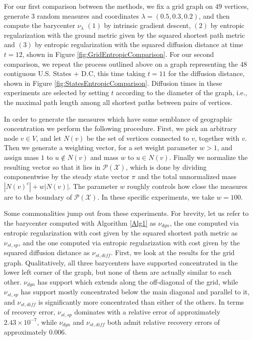 \documentclass{article}
\newcommand{\X}{\mathcal{X}}
\begin{document}
For our first comparison between the methods, we fix a grid graph on \(49\) vertices, generate \(3\) random measures and coordinates \(\lambda = (0.5, 0.3, 0.2)\), and then compute the barycenter \(\nu_\lambda\) \((1)\) by intrinsic gradient descent, \((2)\) by entropic regularization with the ground metric given by the squared shortest path metric and \((3)\) by entropic regularization with the squared diffusion distance at time \(t=12\), shown in Figure \ref{fig:GridEntropicComparison}. For our second comparison, we repeat the process outlined above on a graph representing the 48 contiguous U.S. States + D.C, this time taking \(t=11\) for the diffusion distance, shown in Figure \ref{fig:StatesEntropicComparison}. Diffusion times in these experiments are selected by setting \(t\) according to the diameter of the graph, i.e., the maximal path length among all shortest paths between pairs of vertices.

In order to generate the measures which have some semblance of geographic concentration we perform the following procedure. First, we pick an arbitrary node \(v \in V\), and let \(N(v)\) be the set of vertices connected to \(v\), together with \(v\). Then we generate a weighting vector, for a set weight parameter \(w > 1\), and assign mass \(1\) to \(u \notin N(v)\) and mass \(w\) to \(u \in N(v)\). Finally we normalize the resulting vector so that it lies in \(\mathcal{P}(\X)\), which is done by dividing componentwise by the steady state vector \(\pi\) and the total unnormalized mass \(|N(v)^c| + w|N(v)|\). The parameter \(w\) roughly controls how close the measures are to the boundary of \(\mathcal{P}(\X)\). In these specific experiments, we take \(w=100\).

Some commonalities jump out from these experiments. For brevity, let us refer to the barycenter computed with Algorithm \ref{Alg1} as \(\nu_{dyn}\), the one computed via entropic regularization with cost given by the squared shortest path metric as \(\nu_{st,sp}\), and the one computed via entropic regularization with cost given by the squared diffusion distance as \(\nu_{st, diff}\). 
First, we look at the results for the grid graph. Qualitatively, all three barycenters have supported concentrated in the lower left corner of the graph, but none of them are actually similar to each other. \(\nu_{dyn}\) has support which extends along the off-diagonal of the grid, while \(\nu_{st,sp}\) has support mostly concentrated below the main diagonal and parallel to it, and \(\nu_{st,diff}\) is significantly more concentrated than either of the others. In terms of recovery error, \(\nu_{st,sp}\) dominates with a relative error of approximately \(2.43\times 10^{-7}\), while \(\nu_{dyn}\) and \(\nu_{st,diff}\) both admit relative recovery errors of approximately \(0.006\). 
\end{document}
